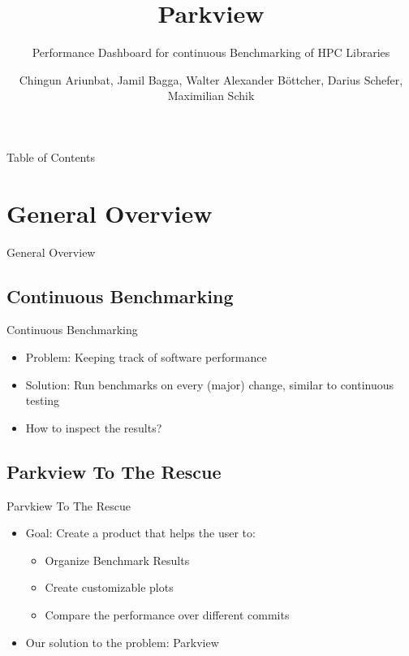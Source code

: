 \documentclass{beamer}
\title{Parkview}
\subtitle{Performance Dashboard for continuous Benchmarking of HPC Libraries}
\author{Chingun Ariunbat, Jamil Bagga, Walter Alexander B\"ottcher, Darius Schefer, Maximilian Schik}
\begin{document}
\maketitle

\begin{frame}{Table of Contents}
  \tableofcontents
\end{frame}

\section{General Overview}
\begin{frame}
  \begin{center}
    \Huge{General Overview}
  \end{center}
\end{frame}

\subsection{Continuous Benchmarking}
\begin{frame}{Continuous Benchmarking}
  \begin{itemize}
      \item Problem: Keeping track of software performance
      \item Solution: Run benchmarks on every (major) change, similar to continuous testing
      \item How to inspect the results?
  \end{itemize}
\end{frame}

\subsection{Parkview To The Rescue}
\begin{frame}{Parvkiew To The Rescue}
  \begin{itemize}
      \item Goal: Create a product that helps the user to:
        \begin{itemize}
          \item Organize Benchmark Results
          \item Create customizable plots
          \item Compare the performance over different commits
        \end{itemize}
      \item Our solution to the problem: Parkview
  \end{itemize}
\end{frame}
\end{document}
